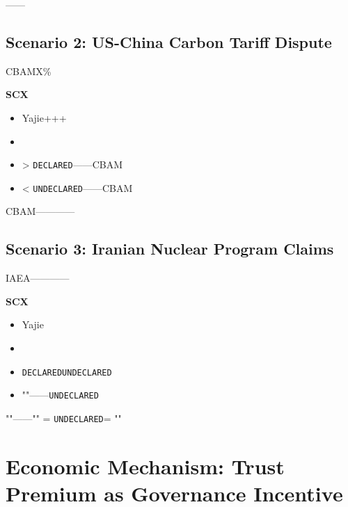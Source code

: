 \documentclass[12pt,a4paper]{article}
\theoremstyle{remark}
\newcommand{\UNDECLARED}{\texttt{UNDECLARED}}
\newcommand{\DECLARED}{\texttt{DECLARED}}
\begin{document}
\textbf{}\textbf{}——\textbf{}

\subsection{}
\subsection{Scenario 2: US-China Carbon Tariff Dispute}

\textbf{}CBAMX\%

\textbf{SCX}
\begin{itemize}[nosep]
    \item Yajie+++
    \item 
    \item  > \DECLARED{}——CBAM
    \item  < \UNDECLARED——CBAM
\end{itemize}

\textbf{}CBAM\textbf{}——\textbf{}——\textbf{}

\subsection{}
\subsection{Scenario 3: Iranian Nuclear Program Claims}

\textbf{}IAEA——\textbf{}——

\textbf{SCX}
\begin{itemize}[nosep]
    \item Yajie
    \item 
    \item \DECLARED\UNDECLARED
    \item ""——\UNDECLARED{}
\end{itemize}

\textbf{}""——"" = \UNDECLARED = ""


\section{}
\section{Economic Mechanism: Trust Premium as Governance Incentive}
\end{document}
